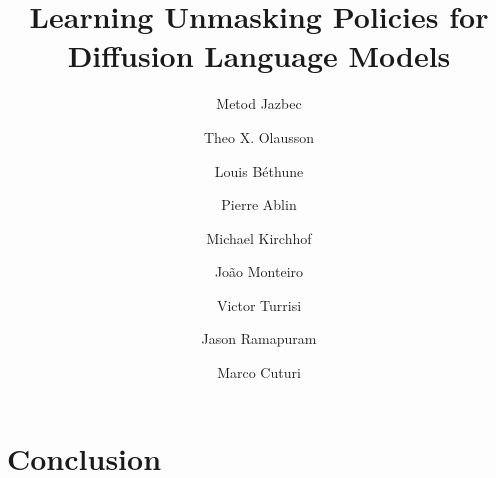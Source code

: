\documentclass{applemlr}
\title{Learning Unmasking Policies for\\ Diffusion Language Models}
\author[*\dagger]{Metod Jazbec}
\author[*\ddagger]{Theo X. Olausson}
\author{Louis Béthune}
\author{Pierre Ablin}
\author{Michael Kirchhof}
\author{Jo\~ao Monteiro}
\author{Victor Turrisi}
\author{Jason Ramapuram}
\author{Marco Cuturi}
\affiliation{Apple}
\affiliation{University of Amsterdam$^\dagger$}
\affiliation{Massachusetts Institute of Technology$^\ddagger$}
\begin{document}
\maketitle



%

% 
% 




\section{Conclusion}





\appendix





\end{document}
